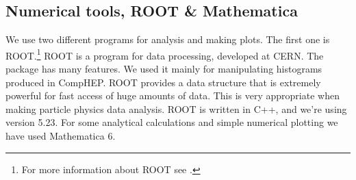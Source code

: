 \subsection{Numerical tools, ROOT \& Mathematica}
We use two different programs for analysis and making plots. The first one is ROOT.\footnote{For more information about ROOT see \cite{rootweb}.} ROOT is a program for data processing, developed at CERN. The package has many features. We used it mainly for manipulating histograms produced in CompHEP. ROOT provides a data structure that is extremely powerful for fast access of huge amounts of data. This is very appropriate when making particle physics data analysis. ROOT is written in C++, and we're using version 5.23. For some analytical calculations and simple numerical plotting we have used Mathematica 6.
